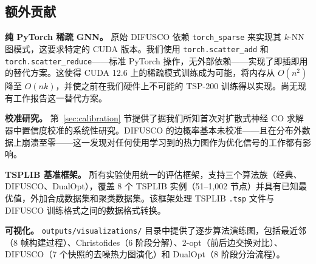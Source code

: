 \documentclass[11pt,a4paper]{ctexart}
\begin{document}
\subsection{额外贡献}

\textbf{纯 PyTorch 稀疏 GNN。} 原始 DIFUSCO 依赖 \texttt{torch\_sparse} 来实现其 $k$-NN 图模式，这要求特定的 CUDA 版本。我们使用 \texttt{torch.scatter\_add} 和 \texttt{torch.scatter\_reduce}——标准 PyTorch 操作，无外部依赖——实现了即插即用的替代方案。这使得 CUDA 12.6 上的稀疏模式训练成为可能，将内存从 $O(n^2)$ 降至 $O(nk)$，并使之前在我们硬件上不可能的 TSP-200 训练得以实现。尚无现有工作报告这一替代方案。

\textbf{校准研究。} 第~\ref{sec:calibration} 节提供了据我们所知首次对扩散式神经 CO 求解器中置信度校准的系统性研究。DIFUSCO 的边概率基本未校准——且在分布外数据上崩溃至零——这一发现对任何使用学习到的热力图作为优化信号的工作都有影响。

\textbf{TSPLIB 基准框架。} 所有实验使用统一的评估框架，支持三个算法族（经典、DIFUSCO、DualOpt），覆盖 8 个 TSPLIB 实例（51--1,002 节点）并具有已知最优值，外加合成数据集和聚类数据集。该框架处理 TSPLIB \texttt{.tsp} 文件与 DIFUSCO 训练格式之间的数据格式转换。

\textbf{可视化。} \texttt{outputs/visualizations/} 目录中提供了逐步算法演练图，包括最近邻（8 帧构建过程）、Christofides（6 阶段分解）、2-opt（前后边交换对比）、DIFUSCO（7 个快照的去噪热力图演化）和 DualOpt（8 阶段分治流程）。
\end{document}
